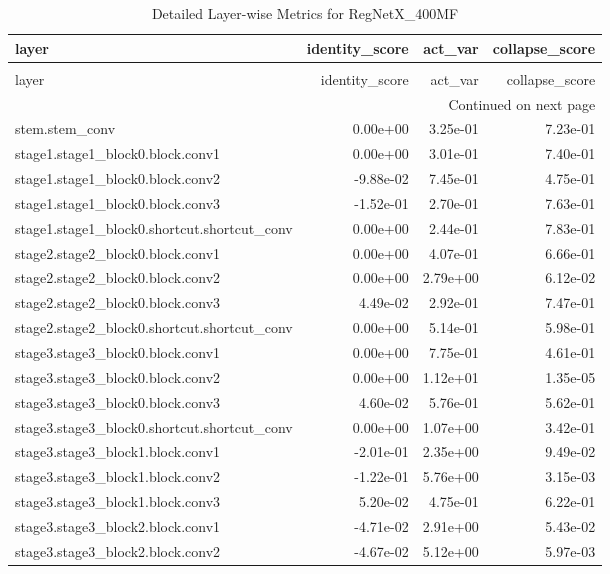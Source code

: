 \begin{longtable}{lrrr}
\caption{Detailed Layer-wise Metrics for RegNetX_400MF} \label{tab:layer_metrics_regnetx_400mf} \\
\toprule
layer & identity_score & act_var & collapse_score \\
\midrule
\endfirsthead
\caption[]{Detailed Layer-wise Metrics for RegNetX_400MF} \\
\toprule
layer & identity_score & act_var & collapse_score \\
\midrule
\endhead
\midrule
\multicolumn{4}{r}{Continued on next page} \\
\midrule
\endfoot
\bottomrule
\endlastfoot
stem.stem_conv & 0.00e+00 & 3.25e-01 & 7.23e-01 \\
stage1.stage1_block0.block.conv1 & 0.00e+00 & 3.01e-01 & 7.40e-01 \\
stage1.stage1_block0.block.conv2 & -9.88e-02 & 7.45e-01 & 4.75e-01 \\
stage1.stage1_block0.block.conv3 & -1.52e-01 & 2.70e-01 & 7.63e-01 \\
stage1.stage1_block0.shortcut.shortcut_conv & 0.00e+00 & 2.44e-01 & 7.83e-01 \\
stage2.stage2_block0.block.conv1 & 0.00e+00 & 4.07e-01 & 6.66e-01 \\
stage2.stage2_block0.block.conv2 & 0.00e+00 & 2.79e+00 & 6.12e-02 \\
stage2.stage2_block0.block.conv3 & 4.49e-02 & 2.92e-01 & 7.47e-01 \\
stage2.stage2_block0.shortcut.shortcut_conv & 0.00e+00 & 5.14e-01 & 5.98e-01 \\
stage3.stage3_block0.block.conv1 & 0.00e+00 & 7.75e-01 & 4.61e-01 \\
stage3.stage3_block0.block.conv2 & 0.00e+00 & 1.12e+01 & 1.35e-05 \\
stage3.stage3_block0.block.conv3 & 4.60e-02 & 5.76e-01 & 5.62e-01 \\
stage3.stage3_block0.shortcut.shortcut_conv & 0.00e+00 & 1.07e+00 & 3.42e-01 \\
stage3.stage3_block1.block.conv1 & -2.01e-01 & 2.35e+00 & 9.49e-02 \\
stage3.stage3_block1.block.conv2 & -1.22e-01 & 5.76e+00 & 3.15e-03 \\
stage3.stage3_block1.block.conv3 & 5.20e-02 & 4.75e-01 & 6.22e-01 \\
stage3.stage3_block2.block.conv1 & -4.71e-02 & 2.91e+00 & 5.43e-02 \\
stage3.stage3_block2.block.conv2 & -4.67e-02 & 5.12e+00 & 5.97e-03 \\

\end{longtable}
